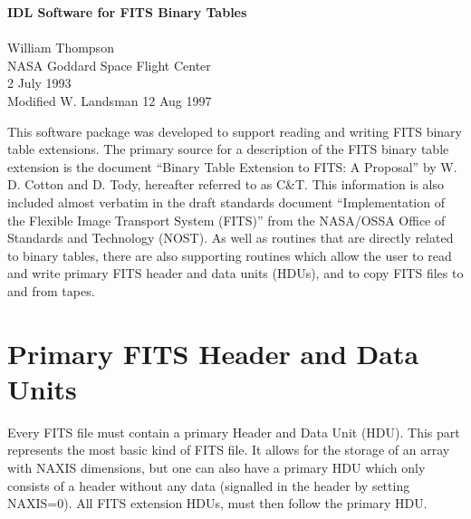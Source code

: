 
\setlength{\oddsidemargin}{0in}		%
\setlength{\topmargin}{-0.5in}		%
\setlength{\textwidth}{6.5in}		%
\setlength{\textheight}{9in}		%

\addtolength{\parskip}{0.5\baselineskip}

\thispagestyle{empty}			%

\begin{center}
{\Large\bf IDL Software for FITS Binary Tables}\\
\mbox{}\\
William Thompson\\
NASA Goddard Space Flight Center\\
2 July 1993\\
Modified W. Landsman 12 Aug 1997 \\
\end{center}

This software package was developed to support reading and writing FITS binary
table extensions.  The primary source for a description of the FITS binary
table extension is the document ``Binary Table Extension to FITS: A Proposal''
by W. D.  Cotton and D. Tody, hereafter referred to as C\&T\@.  This
information is also included almost verbatim in the draft standards document
``Implementation of the Flexible Image Transport System (FITS)'' from the
NASA/OSSA Office of Standards and Technology (NOST)\@.  As well as routines
that are directly related to binary tables, there are also supporting routines
which allow the user to read and write primary FITS header and data units
(HDUs), and to copy FITS files to and from tapes.

\section{Primary FITS Header and Data Units}

Every FITS file must contain a primary Header and Data Unit (HDU).  This part
represents the most basic kind of FITS file.  It allows for the storage of an
array with NAXIS dimensions, but one can also have a primary HDU which only
consists of a header without any data (signalled in the header by setting
NAXIS=0).  All FITS extension HDUs, must then follow the primary HDU.

